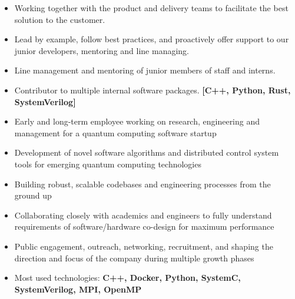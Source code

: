 \documentclass[10pt,a4paper,ragged2e,withhyper]{altacv}
\begin{document}
\begin{paracol}{2}
\begin{itemize}
    \item
    Working together with the product and delivery teams to facilitate the
    best solution to the customer.
    
    \item
    Lead by example, follow best practices, and proactively offer support to our
    junior developers, mentoring and line managing.
    
    \item
    Line management and mentoring of junior members of staff and interns.
    
    \item
    Contributor to multiple internal software packages.
    {\bf [C++, Python, Rust, SystemVerilog]}

    \item
    Early and long-term employee working on research, engineering and management for
    a quantum computing software startup

    \item
    Development of novel software algorithms and distributed control system tools
    for emerging quantum computing technologies
    
    \item
    Building robust, scalable codebases and engineering processes from the ground up
    
    \item
    Collaborating closely with academics and engineers to fully understand requirements of
    software/hardware co-design for maximum performance
    
    \item
    Public engagement, outreach, networking, recruitment, and shaping the direction and
    focus of the company during multiple growth phases
    
    \item
    Most used technologies:
    {\bf C++, Docker, Python, SystemC, SystemVerilog, MPI, OpenMP}

\end{itemize}

\divider

 


\end{paracol}
\end{document}
